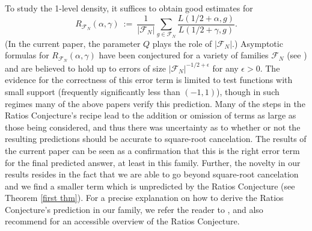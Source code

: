 \documentclass[12pt,reqno]{amsart}
\numberwithin{equation}{section}
\theoremstyle{plain}
\begin{document}
To study the 1-level density, it suffices to obtain good estimates for \begin{equation} R_{\mathcal{F}_N}(\alpha,\gamma)\ :=\ \frac1{|\mathcal{F}_N|} \sum_{g \in \mathcal{F}_N} \frac{L(1/2 + \alpha, g)}{L(1/2 + \gamma, g)}. \end{equation} (In the current paper, the parameter $Q$ plays the role of $|\mathcal{F}_N|$.) Asymptotic formulas for $R_{\mathcal{F}_N}(\alpha,\gamma)$ have been conjectured for a variety of families $\mathcal{F}_N$ (see \cite{CFZ1,CS1,CS2,GJMMNPP,HMM,Mil3,Mil4,MilMo}) and are believed to hold up to errors of size $|\mathcal{F}_N|^{-1/2+\epsilon}$ for any $\epsilon > 0$. The evidence for the correctness of this error term is limited to test functions with small support (frequently  significantly less than $(-1,1)$), though in such regimes many of the above papers verify this prediction. Many of the steps in the Ratios Conjecture's recipe lead to the addition or omission of terms as large as those being considered, and thus there was uncertainty as to whether or not the resulting predictions should be accurate to square-root cancelation. The results of the current paper can be seen as a confirmation that this is the right error term for the final predicted answer, at least in this family.  Further, the novelty in our results resides in the fact that we are able to go beyond square-root cancelation and we find a smaller term which is unpredicted by the Ratios Conjecture (see Theorem \ref{first thm}). For a precise explanation on how to derive the Ratios Conjecture's prediction in our family, we refer the reader to \cite{GJMMNPP}, and also recommend \cite{CS1} for an accessible overview of the Ratios Conjecture.
\end{document}
